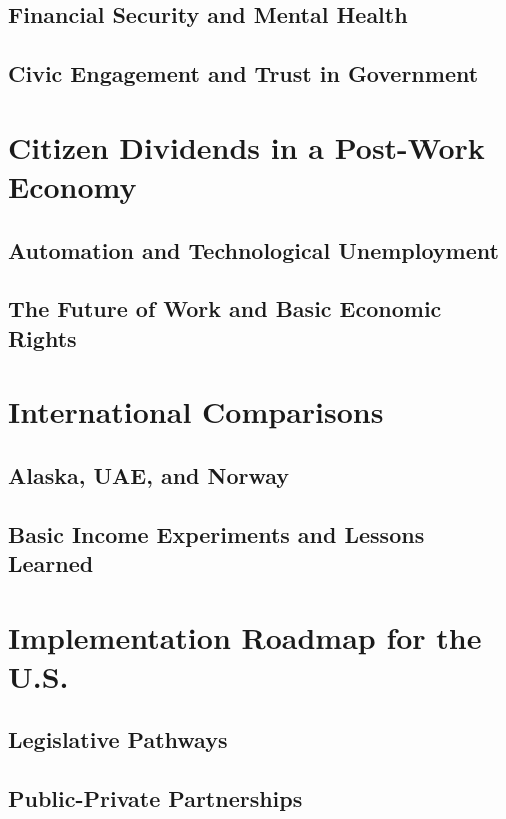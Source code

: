 \documentclass[11pt]{article}
\begin{document}
\subsection{Financial Security and Mental Health}
\lipsum[15-16]

\subsection{Civic Engagement and Trust in Government}
\lipsum[17-18]

\section{Citizen Dividends in a Post-Work Economy}
\subsection{Automation and Technological Unemployment}
\lipsum[19-20]

\subsection{The Future of Work and Basic Economic Rights}
\lipsum[21-22]

\section{International Comparisons}
\subsection{Alaska, UAE, and Norway}
\lipsum[23-24]

\subsection{Basic Income Experiments and Lessons Learned}
\lipsum[25-26]

\section{Implementation Roadmap for the U.S.}
\subsection{Legislative Pathways}
\lipsum[27-28]

\subsection{Public-Private Partnerships}
\lipsum[29-30]
\end{document}

